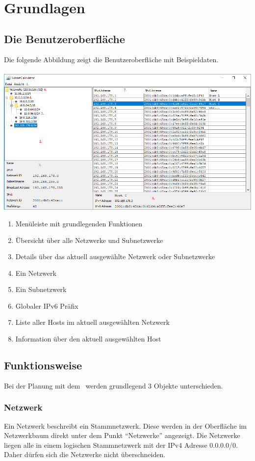 \section{Grundlagen}

\subsection{Die Benutzeroberfläche}
Die folgende Abbildung zeigt die Benutzeroberfläche mit Beispieldaten.\\\\
\includegraphics[width=\textwidth]{resources/oberflaeche.png}\\
\begin{enumerate}
    \item Menüleiste mit grundlegenden Funktionen
    \item Übersicht über alle Netzwerke und Subnetzwerke
    \item Details über das aktuell ausgewählte Netzwerk oder Subnetzwerke
    \item Ein Netzwerk
    \item Ein Subnetzwerk
    \item Globaler IPv6 Präfix
    \item Liste aller Hosts im aktuell ausgewählten Netzwerk
    \item Information über den aktuell ausgewählten Host
\end{enumerate}

\subsection{Funktionsweise}
Bei der Planung mit dem \subnetcalc\ werden grundlegend 3 Objekte unterschieden.

\subsubsection{Netzwerk}
Ein Netzwerk beschreibt ein Stammnetzwerk. Diese werden in der Oberfläche im
Netzwerkbaum direkt unter dem Punkt "`Netzwerke"' angezeigt.
Die Netzwerke liegen alle in einem logischen Stammnetzwerk mit der IPv4 Adresse
0.0.0.0/0. Daher dürfen sich die Netzwerke nicht überschneiden.

